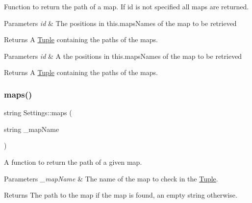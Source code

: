 Function to return the path of a map. If id is not specified all maps are returned.


\begin{DoxyParams}{Parameters}
{\em id} & The positions in this.\+maps\+Names of the map to be retrieved \\
\hline
\end{DoxyParams}
\begin{DoxyReturn}{Returns}
A \mbox{\hyperlink{class_tuple}{Tuple}} containing the paths of the maps.
\end{DoxyReturn}

\begin{DoxyParams}{Parameters}
{\em id} & A the positions in this.\+maps\+Names of the map to be retrieved \\
\hline
\end{DoxyParams}
\begin{DoxyReturn}{Returns}
A \mbox{\hyperlink{class_tuple}{Tuple}} containing the paths of the maps. 
\end{DoxyReturn}
\mbox{\label{class_settings_aa34e6004beffad1bc5fd81f99353d3e1}} 
\subsubsection{\texorpdfstring{maps()}{maps()}\hspace{0.1cm}{\footnotesize\ttfamily [3/4]}}
{\footnotesize\ttfamily string Settings\+::maps (\begin{DoxyParamCaption}\item[{string}]{\+\_\+map\+Name }\end{DoxyParamCaption})}



A function to return the path of a given map. 


\begin{DoxyParams}{Parameters}
{\em \+\_\+map\+Name} & The name of the map to check in the \mbox{\hyperlink{class_tuple}{Tuple}}. \\
\hline
\end{DoxyParams}
\begin{DoxyReturn}{Returns}
The path to the map if the map is found, an empty string otherwise. 
\end{DoxyReturn}
\mbox{\label{class_settings_ab638c9895f57ed5e8ab64084752c660d}} 
